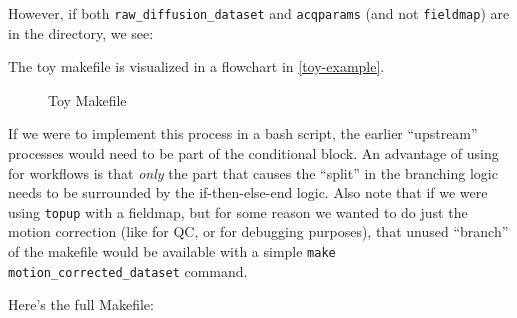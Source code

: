 However, if both \texttt{raw_diffusion_dataset} and \texttt{acqparams} (and not \texttt{fieldmap}) are in the directory, we see:

The toy makefile is visualized in a flowchart in \autoref{toy-example}.

\begin{figure}
	\begin{center}  %
	\end{center}
	\label{toy-example}
	\caption{Toy Makefile}
\end{figure}


If we were to implement this process in a bash script, the earlier ``upstream'' processes would need to be part of the conditional block. An advantage of using \maken{} for workflows is that \textit{only} the part that causes the ``split'' in the branching logic needs to be surrounded by the if-then-else-end logic. Also note that if we were using \texttt{topup} with a fieldmap, but for some reason we wanted to do just the motion correction (like for QC, or for debugging purposes), that unused ``branch'' of the makefile would be available with a simple \texttt{make motion_corrected_dataset} command. 

Here's the full Makefile:

